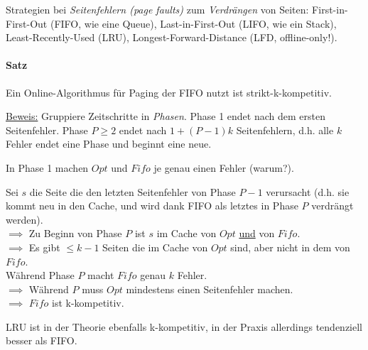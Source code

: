 Strategien bei \emph{Seitenfehlern (page faults)} zum \emph{Verdrängen} von Seiten:
First-in-First-Out (FIFO, wie eine Queue),
Last-in-First-Out (LIFO, wie ein Stack),
Least-Recently-Used (LRU),
Longest-Forward-Distance (LFD, offline-only!).

\paragraph{Satz}
Ein Online-Algorithmus für Paging der FIFO nutzt ist strikt-k-kompetitiv.

\underline{Beweis:}
Gruppiere Zeitschritte in \emph{Phasen}.
Phase 1 endet nach dem ersten Seitenfehler.
Phase $P \geq 2$ endet nach $1+ (P-1)k$ Seitenfehlern, d.h. alle $k$ Fehler endet eine Phase und beginnt eine neue.

In Phase 1 machen $Opt$ und $Fifo$ je genau einen Fehler (warum?).

Sei $s$ die Seite die den letzten Seitenfehler von Phase $P-1$ verursacht
(d.h. sie kommt neu in den Cache, und wird dank FIFO als letztes in Phase $P$ verdrängt werden). \\
$\implies$ Zu Beginn von Phase $P$ ist $s$ im Cache von $Opt$ \underline{und} von $Fifo$. \\
$\implies$ Es gibt $\leq k-1$ Seiten die im Cache von $Opt$ sind, aber nicht in dem von $Fifo$. \\
Während Phase $P$ macht $Fifo$ genau $k$ Fehler. \\
$\implies$  Während $P$ muss $Opt$ mindestens einen Seitenfehler machen. \\
$\implies$  $Fifo$ ist k-kompetitiv.

LRU ist in der Theorie ebenfalls k-kompetitiv, in der Praxis allerdings tendenziell besser als FIFO.


